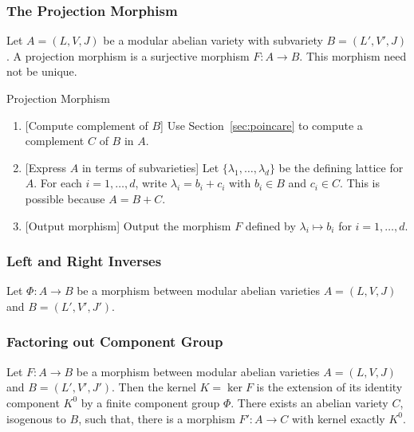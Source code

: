 \documentclass{article}
\begin{document}
\subsubsection{The Projection Morphism}

Let $A=(L, V, J)$ be a modular abelian variety with subvariety $B=(L', V', J)$.
A projection morphism is a surjective morphism $F:A\to B$. This morphism need
not be unique.
\begin{algorithm}{Projection Morphism}
\begin{enumerate}
    \item{} [Compute complement of $B$]
        Use Section~\ref{sec:poincare} to compute a complement $C$ of $B$ in
        $A$. 
    \item{} [Express $A$ in terms of subvarieties]
        Let $\{\lambda_1,\ldots, \lambda_d\}$ be the defining lattice for $A$.
        For each $i=1,\ldots,d$, write $\lambda_i = b_i + c_i$ with $b_i\in B$
        and $c_i \in C$. This is possible because $A=B+C$.
    \item{} [Output morphism]
        Output the morphism $F$ defined by $\lambda_i\mapsto b_i$ for
        $i=1,\ldots,d$.
\end{enumerate}
\end{algorithm}

\subsubsection{Left and Right Inverses}

Let $\Phi:A\to B$ be a morphism between modular abelian varieties $A=(L, V, J)$
and $B=(L', V', J')$. 

\subsubsection{Factoring out Component Group}
\label{sec:factor_component}


Let $F:A\to B$ be a morphism between modular abelian varieties $A=(L, V, J)$
and $B=(L', V', J')$. Then the kernel $K=\ker F$ is the extension of its
identity component $K^0$ by a finite component group $\Phi$. There exists an
abelian variety $C$, isogenous to $B$, such that, there is a morphism $F':A\to
C$ with kernel exactly $K^0$.
\end{document}
